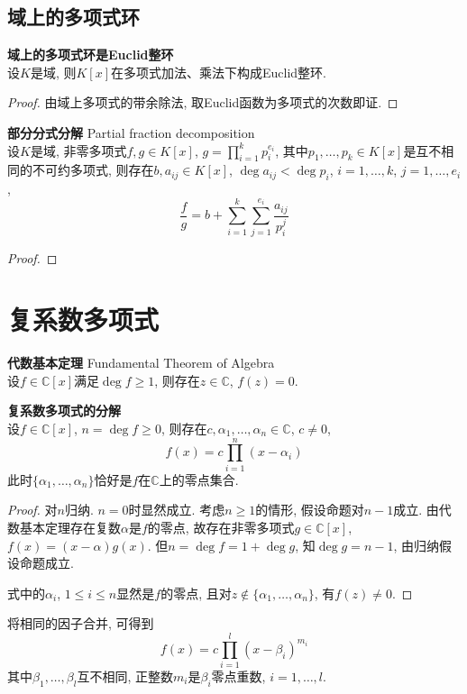 \subsection{域上的多项式环}

\begin{col} \textbf{域上的多项式环是Euclid整环}\\
设$K$是域, 则$K[x]$在多项式加法、乘法下构成Euclid整环. 
\end{col}
\begin{proof}
由域上多项式的带余除法, 取Euclid函数为多项式的次数即证. 
\end{proof}

\begin{pro} \textbf{部分分式分解} Partial fraction decomposition\\
设$K$是域, 非零多项式$f,g \in K[x]$, $g=\prod_{i=1}^k p_i^{e_i}$, 其中$p_1,\dots,p_k\in K[x]$是互不相同的不可约多项式, 则存在$b, a_{ij} \in K[x]$, $\deg a_{ij}<\deg p_i$, $i=1,\dots,k$, $j=1,\dots, e_i$,
\begin{equation}
    \frac{f}{g} = b + \sum_{i=1}^k \sum_{j=1}^{e_i} \frac{a_{ij}}{p_i^j}
\end{equation}
\end{pro}
\begin{proof}

\end{proof}

\section{复系数多项式}

\begin{thm}  \textbf{代数基本定理} Fundamental Theorem of Algebra\\
设$f\in \mathbb{C}[x]$满足$\deg f \ge 1$, 则存在$z\in \mathbb{C}$, $f(z)=0$.
\end{thm}

\begin{pro}\textbf{复系数多项式的分解}\\
设$f\in \mathbb{C}[x]$, $n=\deg f \ge 0$, 则存在$c, \alpha_1, \dots, \alpha_n\in \mathbb{C}$, $c\neq 0$, 
\begin{equation}
    f(x) = c\prod_{i=1}^n (x-\alpha_i)
\end{equation}
此时$\{\alpha_1,\dots,\alpha_n\}$恰好是$f$在$\mathbb{C}$上的零点集合. 
\end{pro}
\begin{proof}
对$n$归纳. $n=0$时显然成立. 考虑$n\ge 1$的情形, 假设命题对$n-1$成立. 由代数基本定理存在复数$\alpha$是$f$的零点, 故存在非零多项式$g\in \mathbb{C}[x]$, $f(x)=(x-\alpha)g(x)$. 但$n=\deg f = 1 + \deg g$, 知$\deg g=n-1$, 由归纳假设命题成立. 

式中的$\alpha_i$, $1\le i\le n$显然是$f$的零点, 且对$z\notin \{\alpha_1,\dots,\alpha_n\}$, 有$f(z)\neq 0$. 
\end{proof}
将相同的因子合并, 可得到
\begin{equation}
    f(x) = c\prod_{i=1}^l (x-\beta_i)^{m_i}
\end{equation}
其中$\beta_1,\dots, \beta_l$互不相同, 正整数$m_i$是$\beta_i$零点重数, $i=1,\dots,l$. 

